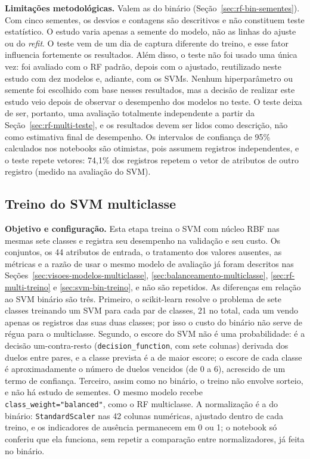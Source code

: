 \documentclass[
    12pt,                %
    openright,           %
    oneside,             %
    a4paper,             %
    english,             %
    brazil               %
]{abntex2}
\begin{document}
\textbf{Limitações metodológicas.} Valem as do binário (Seção~\ref{sec:rf-bin-sementes}). Com cinco sementes, os desvios e contagens são descritivos e não constituem teste estatístico. O estudo varia apenas a semente do modelo, não as linhas do ajuste ou do \textit{refit}. O teste vem de um dia de captura diferente do treino, e esse fator influencia fortemente os resultados. Além disso, o teste não foi usado uma única vez: foi avaliado com o RF padrão, depois com o ajustado, reutilizado neste estudo com dez modelos e, adiante, com os SVMs. Nenhum hiperparâmetro ou semente foi escolhido com base nesses resultados, mas a decisão de realizar este estudo veio depois de observar o desempenho dos modelos no teste. O teste deixa de ser, portanto, uma avaliação totalmente independente a partir da Seção~\ref{sec:rf-multi-teste}, e os resultados devem ser lidos como descrição, não como estimativa final de desempenho. Os intervalos de confiança de 95\% calculados nos notebooks são otimistas, pois assumem registros independentes, e o teste repete vetores: 74,1\% dos registros repetem o vetor de atributos de outro registro (medido na avaliação do SVM).
 
 
\subsection{Treino do SVM multiclasse}
\label{sec:svm-multi-treino}
 
\textbf{Objetivo e configuração.} Esta etapa treina o SVM com núcleo RBF nas mesmas sete classes e registra seu desempenho na validação e seu custo. Os conjuntos, os 44 atributos de entrada, o tratamento dos valores ausentes, as métricas e a razão de usar o mesmo modelo de avaliação já foram descritos nas Seções~\ref{sec:visoes-modelos-multiclasse}, \ref{sec:balanceamento-multiclasse}, \ref{sec:rf-multi-treino} e \ref{sec:svm-bin-treino}, e não são repetidos. As diferenças em relação ao SVM binário são três. Primeiro, o scikit-learn resolve o problema de sete classes treinando um SVM para cada par de classes, 21 no total, cada um vendo apenas os registros das suas duas classes; por isso o custo do binário não serve de régua para o multiclasse. Segundo, o escore do SVM não é uma probabilidade: é a decisão um-contra-resto (\texttt{decision\_function}, com sete colunas) derivada dos duelos entre pares, e a classe prevista é a de maior escore; o escore de cada classe é aproximadamente o número de duelos vencidos (de 0 a 6), acrescido de um termo de confiança. Terceiro, assim como no binário, o treino não envolve sorteio, e não há estudo de sementes. O mesmo modelo recebe \texttt{class\_weight="balanced"}, como o RF multiclasse. A normalização é a do binário: \texttt{StandardScaler} nas 42 colunas numéricas, ajustado dentro de cada treino, e os indicadores de ausência permanecem em 0 ou 1; o notebook só conferiu que ela funciona, sem repetir a comparação entre normalizadores, já feita no binário.
 
\end{document}
